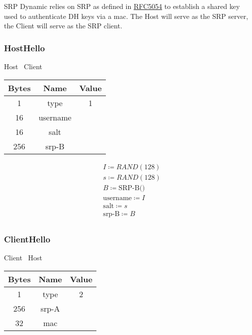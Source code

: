 SRP Dynamic relies on SRP as defined in \href{https://datatracker.ietf.org/doc/html/rfc5054}{RFC5054} to establish a
shared key used to authenticate DH keys via a mac. The Host will serve as the SRP server, the Client will serve as the SRP
client.\\

\subsubsection{HostHello}

\begin{center}
    Host \textrightarrow\ Client\\
    \begin{tabular}{|c|c|c|}
        \hline
        \textbf{Bytes} & \textbf{Name} & \textbf{Value} \\
        \hline
        1              & type          & 1              \\
        \hline
        16             & username      &                \\
        \hline
        16             & salt          &                \\
        \hline
        256            & srp-B         &                \\
        \hline
    \end{tabular}
\end{center}

\begin{align*}
    & I \coloneqq RAND(128)\\
    & s \coloneqq RAND(128)\\
    & B \coloneqq \text{SRP-B()}\\
    & \text{username} \coloneqq I\\
    & \text{salt} \coloneqq s\\
    & \text{srp-B} \coloneqq B\\
\end{align*}

\subsubsection{ClientHello}

\begin{center}
    Client \textrightarrow\ Host\\
    \begin{tabular}{|c|c|c|}
        \hline
        \textbf{Bytes} & \textbf{Name} & \textbf{Value} \\
        \hline
        1              & type          & 2              \\
        \hline
        256            & srp-A         &                \\
        \hline
        32             & mac           &                \\
        \hline
    \end{tabular}
\end{center}

